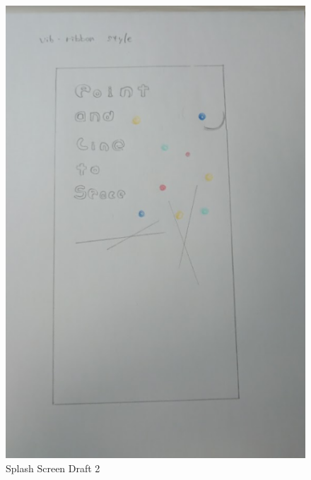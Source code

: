 \begin{figure}[htbp]
	\centering
		\includegraphics[width=1.00\textwidth]{img/Menu5.png}
	\caption[Splash Screen Draft 2]{Splash Screen Draft 2}
	\label{fig:Menu5}
\end{figure}

